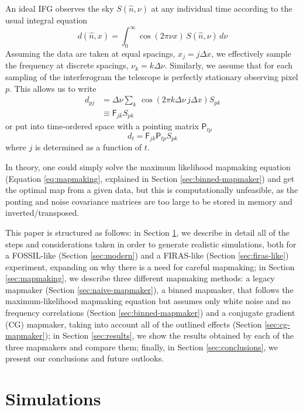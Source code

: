\documentclass{aa}
\begin{document}
An ideal IFG observes the sky $S(\hat n,\nu)$ at any individual time according to the usual integral equation
\begin{equation}
	d(\hat n,x)=\int_0^\infty \cos(2\pi\nu x)\,S(\hat n,\nu)\,d\nu
\end{equation}
Assuming the data are taken at equal spacings, $x_j=j\Delta x$, we effectively sample the frequency at discrete spacings, $\nu_k=k\Delta\nu$. Similarly, we assume that for each sampling of the interferogram the telescope is perfectly stationary observing pixel $p$. This allows us to write 
\begin{align}
	d_{pj}&=\Delta\nu\sum_k\,\cos(2\pi k\Delta \nu\,j\Delta x)S_{pk}	
	\\
	&\equiv \mathsf F_{jk}S_{pk}
\end{align}
or put into time-ordered space with a pointing matrix $\mathsf P_{tp}$
\begin{equation}
	d_t=\mathsf F_{jk}\mathsf P_{tp}S_{pk}
\end{equation}
where $j$ is determined as a function of $t$.

In theory, one could simply solve the maximum likelihood mapmaking equation (Equation \eqref{eq:mapmaking}, explained in Section \ref{sec:binned-mapmaker}) and get the optimal map from a given data, but this is computationally unfeasible, as the ponting and noise covariance matrices are too large to be stored in memory and inverted/transposed.

This paper is structured as follows: in Section \ref{sec:simulations}, we describe in detail all of the steps and considerations taken in order to generate realistic simulations, both for a FOSSIL-like (Section \ref{sec:modern}) and a FIRAS-like (Section \ref{sec:firas-like}) experiment, expanding on why there is a need for careful mapmaking; in Section \ref{sec:mapmaking}, we describe three different mapmaking methods: a legacy mapmaker (Section \ref{sec:naive-mapmaker}), a binned mapmaker, that follows the maximum-likelihood mapmaking equation but assumes only white noise and no frequency correlations (Section \ref{sec:binned-mapmaker}) and a conjugate gradient (CG) mapmaker, taking into account all of the outlined effects (Section \ref{sec:cg-mapmaker}); in Section \ref{sec:results}, we show the results obtained by each of the three mapmakers and compare them; finally, in Section \ref{sec:conclusions}, we present our conclusions and future outlooks.

\section{Simulations}
\label{sec:simulations}
\end{document}
